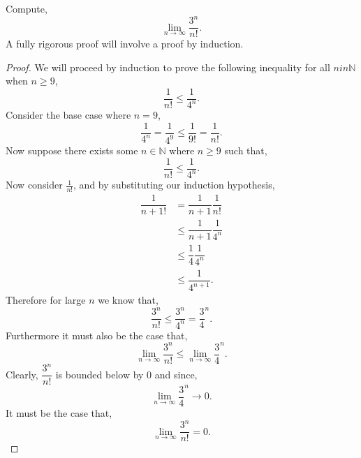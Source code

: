 \documentclass[12pt]{article}
\makeatletter
\theoremstyle{homework}
\newenvironment{exercise}[1]
{\def\@currentlabel{#1}\exercisecore}
{\endexercisecore}
\newcommand{\Nats}{\ensuremath{\mathbb N}}
\makeatother
\begin{document}
\begin{exercise} {3} Compute,
  \begin{equation*}
    \lim_{n \to \infty}\dfrac{3^n}{n!}.
  \end{equation*}
  A fully rigorous proof will involve a proof by induction. \\

\begin{proof}
  We will proceed by induction to prove the following inequality for all $n in \Nats$ when $n \geq 9$,
  \begin{equation*}
    \dfrac{1}{n!} \le \dfrac{1}{4^n}.
  \end{equation*}
  Consider the base case where $n = 9$,
  \begin{equation*}
    \dfrac{1}{4^n} = \dfrac{1}{4^9} \le \dfrac{1}{9!} = \dfrac{1}{n!}.
  \end{equation*}
  Now suppose there exists some $n \in \Nats$ where $n \geq 9$ such that,
  \begin{equation*}
    \dfrac{1}{n!} \le \dfrac{1}{4^n}.
  \end{equation*}
  Now consider $\frac{1}{n!}$, and by substituting our induction hypothesis,
  \begin{align*}
    \dfrac{1}{n+1!}  &= \dfrac{1}{n+1}\dfrac{1}{n!}\\
    &\le  \dfrac{1}{n+1}\dfrac{1}{4^n}\\
    &\le  \dfrac{1}{4}\dfrac{1}{4^n}\\
    &\le  \dfrac{1}{4^{n+1}}.
  \end{align*}
  Therefore for large $n$ we know that, 
  \begin{equation*}
  \dfrac{3^n}{n!} \le \dfrac{3^n}{4^n} = \dfrac{3}{4}^n.
  \end{equation*}
  Furthermore it must also be the case that, 
  \begin{equation*}
    \lim_{n \to \infty}\dfrac{3^n}{n!} \le  \lim_{n \to \infty}\dfrac{3}{4}^n.
  \end{equation*}
  Clearly, $\dfrac{3^n}{n!}$ is bounded below by $0$ and since,
  \begin{equation*}
    \lim_{n \to \infty}\dfrac{3}{4}^n \to 0.
  \end{equation*}
It must be the case that,
\begin{equation*}
  \lim_{n \to \infty}\dfrac{3^n}{n!} = 0.
\end{equation*}

\end{proof}

\end{exercise}
\vspace{.5in}
\end{document}

